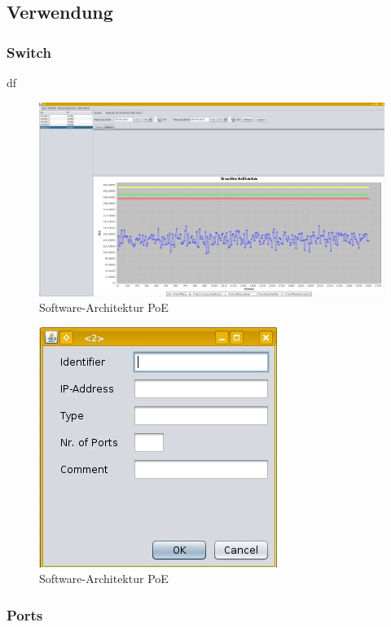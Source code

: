 \subsection{Verwendung}


\subsubsection{Switch}

df

\begin{figure}[h]
    \centering
    \leavevmode
    \includegraphics[width=1.0\linewidth]{figures/screenshot2.jpg}
    \caption{Software-Architektur PoE}
    \label{fig:Ports-PoE}
\end{figure}


\begin{figure}[h]
    \centering
    \leavevmode
    \includegraphics[scale=0.5]{figures/screenshot3.jpg}
    \caption{Software-Architektur PoE}
    \label{fig:NeuerSwitch-PoE}
\end{figure}

\subsubsection{Ports}

